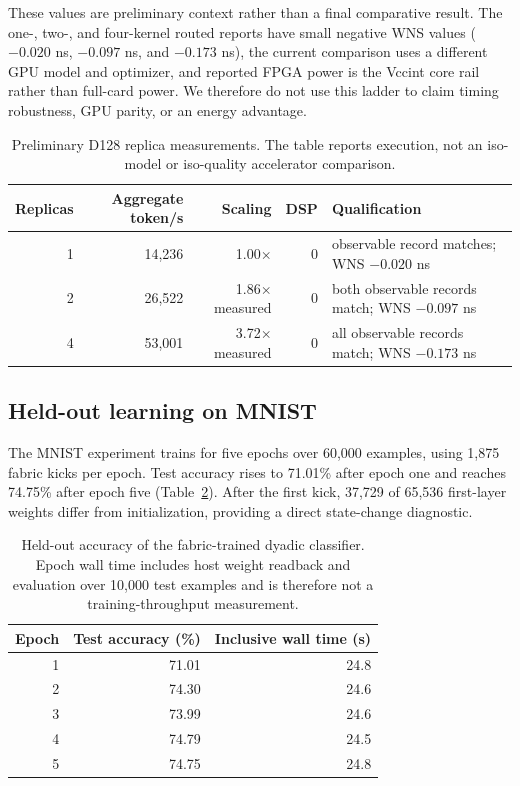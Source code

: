 \documentclass[10pt]{article}
\begin{document}
These values are preliminary context rather than a final comparative result.
The one-, two-, and four-kernel routed reports have small negative WNS values
($-0.020$ ns, $-0.097$ ns, and $-0.173$ ns), the current comparison uses a different GPU
model and optimizer, and reported FPGA power is the Vccint core rail rather
than full-card power.  We therefore do not use this ladder to claim timing
robustness, GPU parity, or an energy advantage.

\begin{table}[t]
\centering
\caption{Preliminary D128 replica measurements.  The table reports execution,
not an iso-model or iso-quality accelerator comparison.}
\label{tab:d128}
\small
\begin{tabular}{rrrrl}
\toprule
Replicas & Aggregate token/s & Scaling & DSP & Qualification \\
\midrule
1 & 14,236 & 1.00$\times$ & 0 & observable record matches; WNS $-0.020$ ns \\
2 & 26,522 & 1.86$\times$ measured & 0 & both observable records match; WNS $-0.097$ ns \\
4 & 53,001 & 3.72$\times$ measured & 0 & all observable records match; WNS $-0.173$ ns \\
\bottomrule
\end{tabular}
\end{table}

\subsection{Held-out learning on MNIST}

The MNIST experiment trains for five epochs over 60,000 examples, using 1,875
fabric kicks per epoch.  Test accuracy rises to 71.01\% after epoch one and
reaches 74.75\% after epoch five (Table~\ref{tab:mnist}).  After the first kick,
37,729 of 65,536 first-layer weights differ from initialization, providing a
direct state-change diagnostic.

\begin{table}[t]
\centering
\caption{Held-out accuracy of the fabric-trained dyadic classifier.  Epoch wall
time includes host weight readback and evaluation over 10,000 test examples and
is therefore not a training-throughput measurement.}
\label{tab:mnist}
\small
\begin{tabular}{rrr}
\toprule
Epoch & Test accuracy (\%) & Inclusive wall time (s) \\
\midrule
1 & 71.01 & 24.8 \\
2 & 74.30 & 24.6 \\
3 & 73.99 & 24.6 \\
4 & 74.79 & 24.5 \\
5 & 74.75 & 24.8 \\
\bottomrule
\end{tabular}
\end{table}
\end{document}
